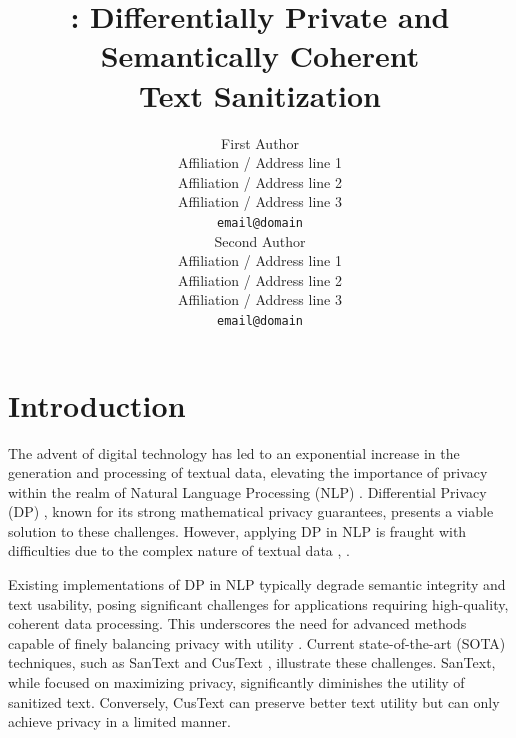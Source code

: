 \documentclass[11pt]{article}
\title{\clusant: Differentially Private and Semantically Coherent \\Text Sanitization}
\author{First Author \\
  Affiliation / Address line 1 \\
  Affiliation / Address line 2 \\
  Affiliation / Address line 3 \\
  \texttt{email@domain} \\\And
  Second Author \\
  Affiliation / Address line 1 \\
  Affiliation / Address line 2 \\
  Affiliation / Address line 3 \\
  \texttt{email@domain} \\}
\begin{document}
\maketitle








\section{Introduction}

The advent of digital technology has led to an exponential increase in the generation and processing of textual data, elevating the importance of privacy within the realm of Natural Language Processing (NLP) \cite{jegorova2022survey}.  
Differential Privacy (DP) \cite{dwork2006differential}, known for its strong mathematical privacy guarantees, presents a viable solution to these challenges. However, applying DP in NLP is fraught with difficulties due to the complex nature of textual data %
\cite{carlini2021extracting}, \cite{song2020information}.

Existing implementations of DP in NLP typically degrade semantic integrity and text usability, posing significant challenges for applications requiring high-quality, coherent data processing. This underscores the need for advanced methods capable of finely balancing privacy with utility \cite{lyu2020towards,anil2021large,dupuy2022efficient, li2018towards,mireshghallah2021privacy}. 
Current state-of-the-art (SOTA) techniques, such as SanText \cite{yue2021differential} and CusText \cite{chen2023customized}, illustrate these challenges. SanText, while focused on maximizing privacy, significantly diminishes the utility of sanitized text. Conversely, CusText can preserve better text utility  but can only achieve privacy in a limited manner. 

\end{document}
